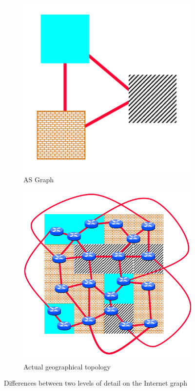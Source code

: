 \begin{figure}[ht]
     \centering
     \begin{subfigure}[b]{0.45\textwidth}
         \centering
         \includegraphics[width=\textwidth]{images/BGP/ASTopology.png}
		 \caption{\ac{AS} Graph}
         \label{fig:as_graph}
     \end{subfigure}
     \hfill
     \begin{subfigure}[b]{0.45\textwidth}
         \centering
         \includegraphics[width=\textwidth]{images/BGP/InternetTopology.png}
		 \caption{Actual geographical topology}
         \label{fig:actual_topology}
     \end{subfigure}
		\caption{Differences between two levels of detail on the Internet graph}
        \label{fig:astopology_vs_internet}
\end{figure}

